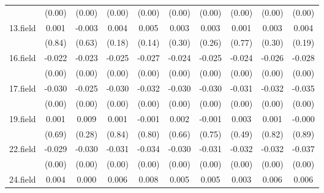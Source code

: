 {\begin{tabular}{l*{9}{c}}
          &   (0.00)         &   (0.00)         &   (0.00)         &   (0.00)         &   (0.00)         &   (0.00)         &   (0.00)         &   (0.00)         &   (0.00)         \\
[1em]
13.field  &    0.001         &   -0.003         &    0.004         &    0.005         &    0.003         &    0.003         &    0.001         &    0.003         &    0.004         \\
          &   (0.84)         &   (0.63)         &   (0.18)         &   (0.14)         &   (0.30)         &   (0.26)         &   (0.77)         &   (0.30)         &   (0.19)         \\
[1em]
16.field  &   -0.022\sym{***}&   -0.023\sym{***}&   -0.025\sym{***}&   -0.027\sym{***}&   -0.024\sym{***}&   -0.025\sym{***}&   -0.024\sym{***}&   -0.026\sym{***}&   -0.028\sym{***}\\
          &   (0.00)         &   (0.00)         &   (0.00)         &   (0.00)         &   (0.00)         &   (0.00)         &   (0.00)         &   (0.00)         &   (0.00)         \\
[1em]
17.field  &   -0.030\sym{***}&   -0.025\sym{***}&   -0.030\sym{***}&   -0.032\sym{***}&   -0.030\sym{***}&   -0.030\sym{***}&   -0.031\sym{***}&   -0.032\sym{***}&   -0.035\sym{***}\\
          &   (0.00)         &   (0.00)         &   (0.00)         &   (0.00)         &   (0.00)         &   (0.00)         &   (0.00)         &   (0.00)         &   (0.00)         \\
[1em]
19.field  &    0.001         &    0.009         &    0.001         &   -0.001         &    0.002         &   -0.001         &    0.003         &    0.001         &   -0.000         \\
          &   (0.69)         &   (0.28)         &   (0.84)         &   (0.80)         &   (0.66)         &   (0.75)         &   (0.49)         &   (0.82)         &   (0.89)         \\
[1em]
22.field  &   -0.029\sym{***}&   -0.030\sym{***}&   -0.031\sym{***}&   -0.034\sym{***}&   -0.030\sym{***}&   -0.031\sym{***}&   -0.032\sym{***}&   -0.032\sym{***}&   -0.037\sym{***}\\
          &   (0.00)         &   (0.00)         &   (0.00)         &   (0.00)         &   (0.00)         &   (0.00)         &   (0.00)         &   (0.00)         &   (0.00)         \\
[1em]
24.field  &    0.004         &    0.000         &    0.006\sym{*}  &    0.008\sym{*}  &    0.005\sym{*}  &    0.005\sym{*}  &    0.003         &    0.006\sym{*}  &    0.006\sym{*}  \\

\end{tabular}}
